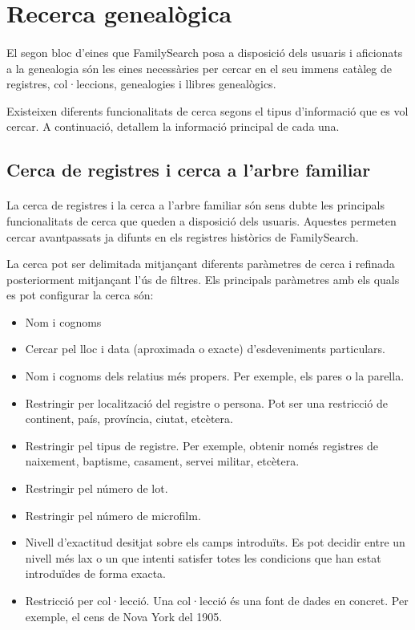 \section{Recerca genealògica}

    \paragraph{}
    El segon bloc d’eines que FamilySearch posa a disposició dels usuaris i aficionats a la genealogia són les eines necessàries per cercar en el seu immens catàleg de registres, col·leccions, genealogies i llibres genealògics.

    Existeixen diferents funcionalitats de cerca segons el tipus d'informació que es vol cercar. A continuació, detallem la informació principal de cada una.

    \subsection{Cerca de registres i cerca a l'arbre familiar}

        \paragraph{}
        La cerca de registres i la cerca a l'arbre familiar són sens dubte les principals funcionalitats de cerca que queden a disposició dels usuaris. Aquestes permeten cercar avantpassats ja difunts en els registres històrics de FamilySearch.

        La cerca pot ser delimitada mitjançant diferents paràmetres de cerca i refinada posteriorment mitjançant l’ús de filtres. Els principals paràmetres amb els quals es pot configurar la cerca són:

        \begin{itemize}
            \item Nom i cognoms
            \item Cercar pel lloc i data (aproximada o exacte) d’esdeveniments particulars.
            \item Nom i cognoms dels relatius més propers. Per exemple, els pares o la parella.
            \item Restringir per localització del registre o persona. Pot ser una restricció de continent, país, província, ciutat, etcètera.
            \item Restringir pel tipus de registre. Per exemple, obtenir només registres de nai\-xe\-ment, baptisme, casament, servei militar, etcètera.
            \item Restringir pel número de lot.
            \item Restringir pel número de microfilm.
            \item Nivell d’exactitud desitjat sobre els camps introduïts. Es pot decidir entre un nivell més lax o un que intenti satisfer totes les condicions que han estat introduïdes de forma exacta.
            \item Restricció per col·lecció. Una col·lecció és una font de dades en concret. Per exemple, el cens de Nova York del 1905.
        \end{itemize}

